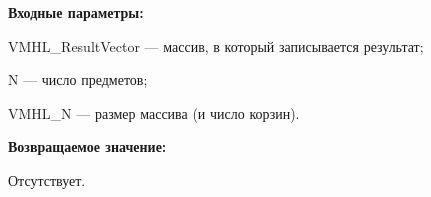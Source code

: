 \textbf{Входные параметры:} 
 
VMHL\_ResultVector --- массив, в который записывается результат;
 
N --- число предметов;
 
VMHL\_N --- размер массива (и число корзин).

\textbf{Возвращаемое значение:}

Отсутствует.